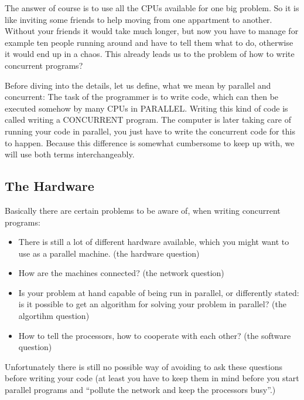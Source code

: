 The answer of course is to use all the CPUs available for one big 
problem. So it is like inviting some friends to help moving
from one appartment to another. Without your friends it would 
take much longer, but now you have to manage for example ten people running
around and have to tell them what to do, otherwise it would end up
in a chaos. This already leads us to the problem of how to write
concurrent programs?

Before diving into the details, let us define, what we mean by parallel
and concurrent:
The task of the programmer is to write code, which can then be executed
somehow by many CPUs in PARALLEL. Writing this kind of code is called
writing a CONCURRENT program. The computer is later 
taking care of running your code in parallel, you just have to write 
the concurrent code for this to happen. Because this difference
is somewhat cumbersome to keep up with, we will use both terms
interchangeably.

\subsection{The Hardware}

Basically there are certain problems to be aware of, when writing
concurrent programs: 
\begin{itemize}
\item There is still a lot of different hardware available, which
        you might want to use as a parallel machine.
        (the hardware question)
\item How are the machines connected?
        (the network question)
\item Is your problem at hand capable of being run in parallel, or
        differently stated: is it possible to get an algorithm
        for solving your problem in parallel?
        (the algortihm question)
\item How to tell the processors, how to cooperate with each other?
        (the software question)
\end{itemize}
Unfortunately there is still no possible way of avoiding to ask
these questions before writing your code (at least you have to
keep them in mind before you start parallel programs and ``pollute the network
and keep the processors busy''.)


